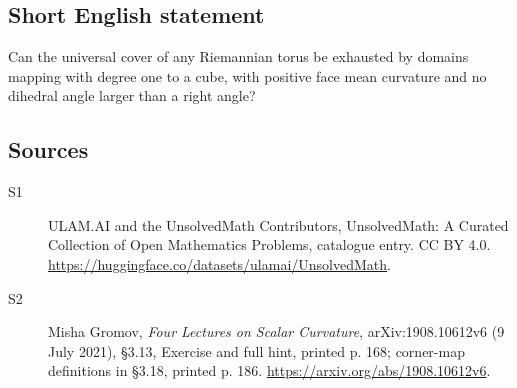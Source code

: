 \documentclass[11pt]{article}
\begin{document}
\subsection{Short English statement}
Can the universal cover of any Riemannian torus be exhausted by domains mapping with degree one to a cube, with positive face mean curvature and no dihedral angle larger than a right angle?
\subsection{Sources}
\begin{description}
\item[\hypertarget{source:statement:1}{S1}] ULAM.AI and the UnsolvedMath Contributors, UnsolvedMath: A Curated Collection of Open Mathematics Problems, catalogue entry. CC BY 4.0. \url{https://huggingface.co/datasets/ulamai/UnsolvedMath}.
\item[\hypertarget{source:statement:2}{S2}] Misha Gromov, \emph{Four Lectures on Scalar Curvature}, arXiv:1908.10612v6 (9 July 2021), \S3.13, Exercise and full hint, printed p. 168; corner-map definitions in \S3.18, printed p. 186. \url{https://arxiv.org/abs/1908.10612v6}.
\end{description}
\label{end:statement}
\end{document}
